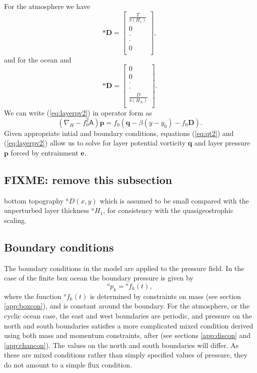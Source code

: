 \documentclass[11pt, a4paper,twoside]{article}
\newcommand{\p}[2]{{{}^{#1}p_{#2}}}
\newcommand{\f}[2]{{{}^{#1}f_{#2}}}
\newcommand{\HH}[2]{{{}^{#1}H_{#2}}}
\newcommand{\vc}[1]{\mathbf{#1}}
\newcommand{\mtx}[1]{\vc{\mathsf{#1}}}
\newcommand{\D}[1]{{}^{#1}D}
\newcommand{\Dt}[1]{\vc{{}^{#1}\vc{D}}}
\numberwithin{equation}{section}
\begin{document}
For the atmosphere we have
\begin{equation}\label{eq:matda}
\Dt{a} =
\left[ \begin{array}{c}
\frac{T}{\delta(H_1)}\\
0\\
\cdot\\
\cdot\\
0\\
 \end{array}\right],
\end{equation}
and for the ocean
and
\begin{equation}\label{eq:matdo}
\Dt{o} =
\left[ \begin{array}{c}
0\\
0\\
\cdot\\
\cdot\\
\frac{D}{\delta(H_N)}\\
 \end{array}\right].
\end{equation}
We can write (\ref{eq:layerpv2}) in operator form as
\begin{equation}\label{eq:layerpv3}
\left(\nabla_H - f^2_0\mtx{A} \right)\vc{p}  = f_0\left(\vc{q} - \beta(y - y_0) - f_0\vc{D}\right).
\end{equation}
Given appropriate intial and boundary conditions, equations (\ref{eq:qt2}) and (\ref{eq:layerpv2}) allow us to solve for layer potential vorticity $\vc{q}$ and layer pressure $\vc{p}$ forced by entrainment $\vc{e}$.

\subsection{FIXME: remove this subsection}
bottom topography $\D{a}(x,y)$ which is assumed to be small compared with the unperturbed layer thickness $\HH{a}{1}$, for consistency with the quasigeostrophic scaling.

\subsection{Boundary conditions}
The boundary conditions in the model are applied to the pressure field.
In the case of the finite box ocean the boundary pressure is given by
\begin{equation}\label{eq:bc1}
\p{o}{k} = \f{o}{k}(t),
\end{equation}
where the function $\f{o}{k}(t)$ is determined by constraints on mass
(see section \ref{app:boxcon}), and is constant around the boundary. 
For the atmosphere, or the cyclic ocean case, the east and west
boundaries are periodic, and pressure on the north and south boundaries
satisfies a more complicated mixed condition derived using
both mass and momentum constraints, after \citet{mcwilliams:77}
(see sections \ref{app:discon} and \ref{app:chancon}). 
The values on the north and south boundaries will differ. 
As these are mixed conditions rather than simply specified values of pressure, they do not amount to a simple flux condition.
\end{document}
